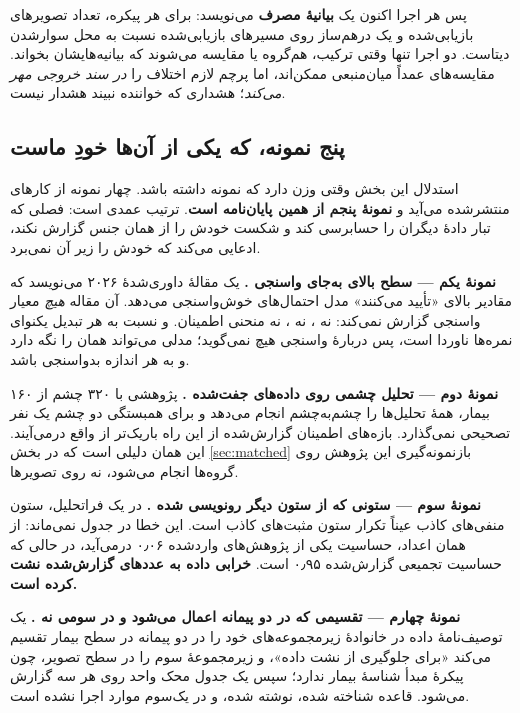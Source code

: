 پس هر اجرا اکنون یک \textbf{بیانیهٔ مصرف} می‌نویسد: برای هر پیکره، تعداد تصویرهای بازیابی‌شده و
یک درهم‌ساز روی مسیرهای بازیابی‌شده نسبت به محل سوارشدن دیتاست. دو اجرا تنها وقتی ترکیب،
هم‌گروه یا مقایسه می‌شوند که بیانیه‌هایشان بخواند. مقایسه‌های عمداً میان‌منبعی ممکن‌اند، اما
پرچم لازم اختلاف را \emph{در سند خروجی مهر می‌کند}؛ هشداری که خواننده نبیند هشدار نیست.

\subsection{پنج نمونه، که یکی از آن‌ها خودِ ماست}
\label{sec:provenance-exhibits}

استدلال این بخش وقتی وزن دارد که نمونه داشته باشد. چهار نمونه از کارهای منتشرشده می‌آید و
\textbf{نمونهٔ پنجم از همین پایان‌نامه است}. ترتیب عمدی است: فصلی که تبار دادهٔ دیگران را
حسابرسی کند و شکست خودش را از همان جنس گزارش نکند، ادعایی می‌کند که خودش را زیر آن نمی‌برد.

\textbf{نمونهٔ یکم — سطح بالای  به‌جای واسنجی \cite{yu2026dualswinord}.} یک مقالهٔ
داوری‌شدهٔ \num{۲۰۲۶} می‌نویسد که مقادیر بالای  «تأیید می‌کنند» مدل احتمال‌های
خوش‌واسنجی می‌دهد. آن مقاله \emph{هیچ} معیار واسنجی گزارش نمی‌کند: نه ، نه
، نه منحنی اطمینان. و  نسبت به هر تبدیل یکنوای نمره‌ها ناوردا است، پس
دربارهٔ واسنجی هیچ نمی‌گوید؛ مدلی می‌تواند همان  را نگه دارد و به هر اندازه
بدواسنجی باشد.

\textbf{نمونهٔ دوم — تحلیل چشمی روی داده‌های جفت‌شده \cite{tomic2024handheld}.} پژوهشی با \num{۳۲۰}
چشم از \num{۱۶۰} بیمار، همهٔ تحلیل‌ها را چشم‌به‌چشم انجام می‌دهد و برای همبستگی دو چشم یک نفر تصحیحی
نمی‌گذارد. بازه‌های اطمینان گزارش‌شده از این راه باریک‌تر از واقع درمی‌آیند. این همان دلیلی است
که در بخش \ref{sec:matched} بازنمونه‌گیری این پژوهش روی گروه‌ها انجام می‌شود، نه روی تصویرها.

\textbf{نمونهٔ سوم — ستونی که از ستون دیگر رونویسی شده \cite{tahir2025meta}.} در یک
فراتحلیل، ستون منفی‌های کاذب عیناً تکرار ستون مثبت‌های کاذب است. این خطا در جدول نمی‌ماند: از
همان اعداد، حساسیت یکی از پژوهش‌های واردشده \num{۰٫۰۶} درمی‌آید، در حالی که حساسیت تجمیعی گزارش‌شده
\num{۰٫۹۵} است. \textbf{خرابی داده به عددهای گزارش‌شده نشت کرده است.}

\textbf{نمونهٔ چهارم — تقسیمی که در دو پیمانه اعمال می‌شود و در سومی نه
\cite{tang2026mmrdr}.} یک توصیف‌نامهٔ داده در خانوادهٔ  زیرمجموعه‌های خود را در دو
پیمانه در سطح بیمار تقسیم می‌کند «برای جلوگیری از نشت داده»، و زیرمجموعهٔ سوم را در سطح تصویر،
چون پیکرهٔ مبدأ شناسهٔ بیمار ندارد؛ سپس یک جدول محک واحد روی هر سه گزارش می‌شود. قاعده
شناخته شده، نوشته شده، و در یک‌سوم موارد اجرا نشده است.

